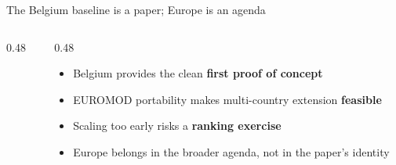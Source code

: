 \documentclass[aspectratio=169,11pt]{beamer}
\begin{document}
\begin{frame}{The Belgium baseline is a paper; Europe is an agenda}

\begin{columns}[T]
\begin{column}{0.48\textwidth}
\centering
{}
\end{column}
\begin{column}{0.48\textwidth}
\begin{itemize}\footnotesize
\item Belgium provides the clean \textbf{first proof of concept}
\item EUROMOD portability makes multi-country extension \textbf{feasible}
\item Scaling too early risks a \textbf{ranking exercise}
\item Europe belongs in the broader agenda, not in the paper's identity
\end{itemize}
\end{column}
\end{columns}
\end{frame}
\end{document}
